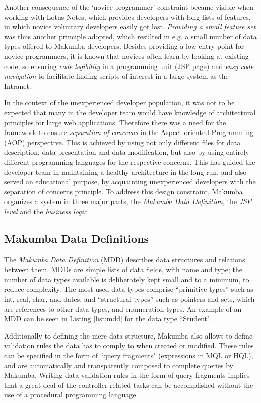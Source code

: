 \documentclass{llncs}
\begin{document}
Another consequence of the `novice programmer' constraint became visible when working with Lotus Notes, which provides developers with long lists of features, in which novice  voluntary developers easily got lost. \textit{Providing a small feature set} was thus another principle adopted, which resulted in e.g. a small number of data types offered to  Makumba developers. Besides providing a low entry point for novice programmers, it is known that novices often learn by looking at existing code, so ensuring \textit{code legibility} in a programming unit (JSP page) and \textit{easy code navigation} to facilitate finding scripts of interest in a large system as the Intranet.

In the context of the unexperienced developer population, it was not  to be expected that many in the developer team would have knowledge of architectural principles for large web applications. Therefore there was a need for the framework to ensure \textit{separation of concerns}  in the Aspect-oriented Programming (AOP) \cite{Kiczales97aspect-orientedprogramming} perspective. This is achieved by using not only different files for data description, data presentation and data modification, but also by using entirely different programming languages for the respective concerns. This has guided the developer team in maintaining a healthy architecture in the long run, and also served an educational purpose, by acquainting unexperienced developers with the separation of concerns principle. To address this design constraint, Makumba organizes a system in three major parts, the \textit{Makumba Data Definition}, the \textit{JSP level} and the \textit{business logic}. 

\subsection{Makumba Data Definitions}
The \textit{Makumba Data Definition} (MDD) describes data structures and relations between them. MDDs are simple lists of data fields, with name and type; the number of data types available is deliberately kept small and to a minimum, to reduce complexity. The most used data types comprise ``primitive types'' such as int, real, char, and dates, and ``structural types'' such as pointers and sets, which are references to other data types, and enumeration types. An example of an MDD can be seen in Listing \ref{list:mdd} for the data type ``Student".

Additionally to defining the mere data structure, Makumba also allows to define validation rules the data has to comply to when created or modified. These rules can be specified in the form of ``query fragments" (expressions in MQL or HQL), and are automatically and transparently composed to complete queries by Makumba. Writing data validation rules in the form of query fragments implies that a great deal of the controller-related tasks can be accomplished without the use of a procedural programming language.
\end{document}
